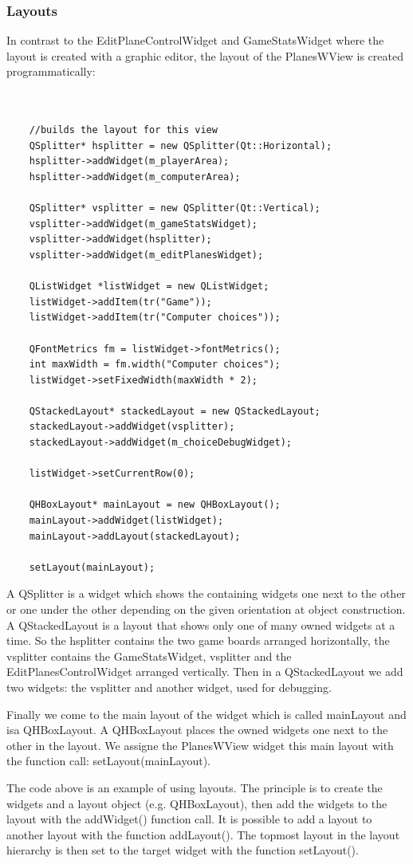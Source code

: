 \subsubsection{Layouts}

In contrast to the EditPlaneControlWidget and GameStatsWidget where the layout is created with a graphic editor, the layout of the PlanesWView is created programmatically:

\begin{lstlisting}


	//builds the layout for this view
	QSplitter* hsplitter = new QSplitter(Qt::Horizontal);
	hsplitter->addWidget(m_playerArea);
	hsplitter->addWidget(m_computerArea);
	
	QSplitter* vsplitter = new QSplitter(Qt::Vertical);
	vsplitter->addWidget(m_gameStatsWidget);
	vsplitter->addWidget(hsplitter);
	vsplitter->addWidget(m_editPlanesWidget);
	
	QListWidget *listWidget = new QListWidget;
	listWidget->addItem(tr("Game"));
	listWidget->addItem(tr("Computer choices"));
	
	QFontMetrics fm = listWidget->fontMetrics();
	int maxWidth = fm.width("Computer choices");
	listWidget->setFixedWidth(maxWidth * 2);
	
	QStackedLayout* stackedLayout = new QStackedLayout;
	stackedLayout->addWidget(vsplitter);
	stackedLayout->addWidget(m_choiceDebugWidget);
	
	listWidget->setCurrentRow(0);
	
	QHBoxLayout* mainLayout = new QHBoxLayout();
	mainLayout->addWidget(listWidget);
	mainLayout->addLayout(stackedLayout);
	
	setLayout(mainLayout);

\end{lstlisting}

A QSplitter is a widget which shows the containing widgets one next to the other or one under the other depending on the given orientation at object construction. A QStackedLayout is a layout that shows only one of many owned widgets at a time. So the hsplitter contains the two game boards arranged horizontally, the vsplitter contains the GameStatsWidget, vsplitter and the EditPlanesControlWidget arranged vertically. Then in a QStackedLayout we add two widgets: the vsplitter and another widget, used for debugging.

Finally we come to the main layout of the widget which is called mainLayout and isa QHBoxLayout. A QHBoxLayout places the owned widgets one next to the other in the layout. We assigne the PlanesWView widget this main layout with the function call: setLayout(mainLayout).

The code above is an example of using layouts. The principle is to create the widgets and a layout object (e.g. QHBoxLayout), then add the widgets to the layout with the addWidget() function call. It is possible to add a layout to another layout with the function addLayout(). The topmost layout in the layout hierarchy is then set to the target widget with the function setLayout().